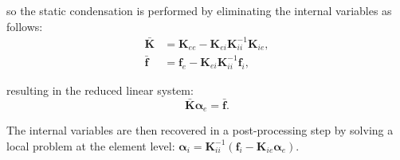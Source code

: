 \documentclass[english,11pt,3p,number,sort&compress]{elsarticle}
\begin{document}
\noindent so the static condensation is performed by eliminating the internal variables as follows:
\begin{equation} \label{eq:static-condensation}
	\begin{aligned}
		\bar{\bm{K}} &= \bm{K}_{ee} - \bm{K}_{ei}\bm{K}_{ii}^{-1}\bm{K}_{ie},\\
		\bar{\bm{f}} &= \bm{f}_e - \bm{K}_{ei}\bm{K}_{ii}^{-1}\bm{f}_i,
	\end{aligned}
\end{equation}

\noindent resulting in the reduced linear system:
\begin{equation} \label{eq:reduced-linear-system}
	\bar{\bm{K}}\bm{\alpha}_e = \bar{\bm{f}}.
\end{equation}

\noindent The internal variables are then recovered in a post-processing step by solving a local problem at the element level: $\bm{\alpha}_i = \bm{K}_{ii}^{-1}(\bm{f}_i - \bm{K}_{ie}\bm{\alpha}_e)$.
\end{document}
